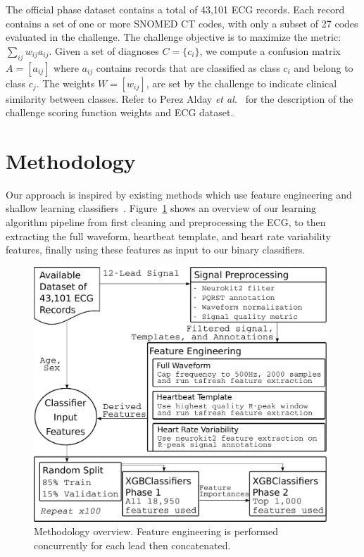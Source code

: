 \documentclass[\main/thesis.tex]{subfiles}
\begin{document}
The official phase dataset contains a total of 43,101 ECG records.
Each record contains a set of one or more SNOMED CT codes, with only a subset of 27 codes evaluated in the challenge.
The challenge objective is to maximize the metric: $\sum_{ij} w_{ij} a_{ij}$.
Given a set of diagnoses $C = \{c_i\}$, we compute a confusion matrix $A = [a_{ij}]$ where $a_{ij}$ contains records that are classified as class $c_i$ and belong to class $c_j$.
The weights $W = [w_{ij}]$, are set by the challenge to indicate clinical similarity between classes.
Refer to Perez Alday \emph{et al.}~\cite{physionet_challenge_2020} for the description of the challenge scoring function weights and ECG dataset.

\section{Methodology}

Our approach is inspired by existing methods which use feature engineering and shallow learning classifiers~\cite{goodwin_classification_2017}.
Figure~\ref{fig:xgb_methodology} shows an overview of our learning algorithm pipeline from first cleaning and preprocessing the ECG, to then extracting the full waveform, heartbeat template, and heart rate variability features, finally using these features as input to our binary classifiers.

\begin{figure}[tbp]
  \centering
  \includegraphics[width=11cm]{figure/xgb_methodology.pdf}
  \caption[Overview of manual feature engineering and gradient boosting decision tree classifier methodology.]{Methodology overview. Feature engineering is performed concurrently for each lead then concatenated.}
  \label{fig:xgb_methodology}
\end{figure}
\end{document}
